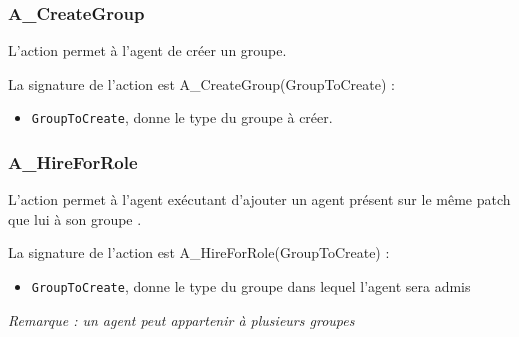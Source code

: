 	
	\subsubsection{A\_CreateGroup}
	
	L'action permet à l'agent  de créer un groupe. 
	
	La signature de l'action  est A\_CreateGroup(GroupToCreate) : 
	
	\begin{itemize}
	\item \texttt{GroupToCreate}, donne le type du groupe à créer.
	\end{itemize}
	
	\subsubsection{A\_HireForRole}
	
	L'action permet à l'agent exécutant d'ajouter un agent présent sur le même patch que lui à son groupe . 
	
	La signature de l'action est A\_HireForRole(GroupToCreate) :
	
	\begin{itemize}
	\item \texttt{GroupToCreate}, donne  le type du groupe dans lequel  l'agent sera admis
	\end{itemize}
	
	\textit{Remarque : un agent peut appartenir à plusieurs groupes}